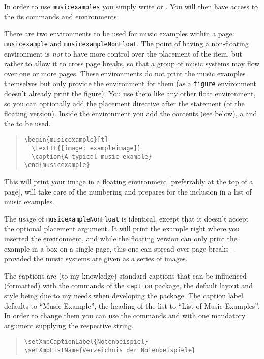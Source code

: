\documentclass{OLLbook}
\begin{document}
\bigskip
In order to use \texttt{musicexamples} you simply write  or .
You will then have access to the its commands and environments:

There are two environments to be used for music examples within a page: \texttt{musicexample} and \texttt{musicexampleNonFloat}.
The point of having a non-floating environment is \emph{not} to have more control over the placement of the item, but rather to allow it to cross page breaks, so that a group of music systems may flow over one or more pages. 
These environments do not print the music examples themselves but only provide the environment for them (as a \texttt{figure} environment doesn't already print the figure).
You use them like any other float environment, so you can optionally add the placement directive after the  statement (of the floating version).
Inside the environment you add the contents (see below), a  and the  to be used.
\begin{quote}
\begin{verbatim}
\begin{musicexample}[t]
  \texttt{[image: exampleimage]}
  \caption{A typical music example}
\end{musicexample}
\end{verbatim}
\end{quote}

This will print your image in a floating environment [preferrably at the top of a page], will take care of the numbering and prepares for the inclusion in a list of music examples.

The usage of \texttt{musicexampleNonFloat} is identical, except that it doesn't accept the optional placement argument.
It will print the example right where you inserted the environment, and while the floating version can only print the example in a box on a single page, this one can spread over page breaks -- provided the music systems are given as a series of images.

The captions are (to my knowledge) standard captions that can be influenced (formatted) with the commands of the \texttt{caption} package, the default layout and style being due to my needs when developing the package.
The caption label defaults to “Music Example”, the heading of the list to “List of Music Examples”.
In order to change them you can use the commands  and  with one mandatory argument supplying the respective string.
\begin{quote}
\begin{verbatim}
\setXmpCaptionLabel{Notenbeispiel}
\setXmpListName{Verzeichnis der Notenbeispiele}
\end{verbatim}
\end{quote}
\end{document}
